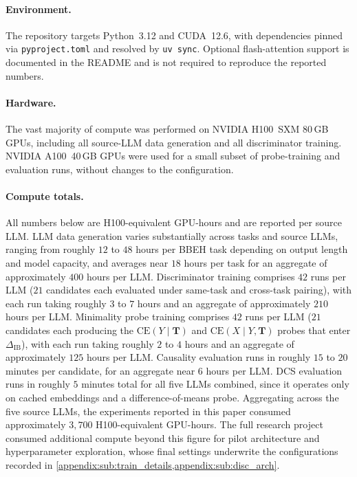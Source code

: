 \paragraph{Environment.} The repository targets Python~3.12 and CUDA~12.6, with dependencies pinned via \texttt{pyproject.toml} and resolved by \texttt{uv sync}. Optional flash-attention support is documented in the README and is not required to reproduce the reported numbers.

\paragraph{Hardware.} The vast majority of compute was performed on NVIDIA H100~SXM 80\,GB GPUs, including all source-LLM data generation and all discriminator training. NVIDIA A100~40\,GB GPUs were used for a small subset of probe-training and evaluation runs, without changes to the configuration.

\paragraph{Compute totals.} All numbers below are H100-equivalent GPU-hours and are reported per source LLM. LLM data generation varies substantially across tasks and source LLMs, ranging from roughly $12$ to $48$ hours per BBEH task depending on output length and model capacity, and averages near $18$ hours per task for an aggregate of approximately $400$ hours per LLM. Discriminator training comprises $42$ runs per LLM ($21$ candidates each evaluated under same-task and cross-task pairing), with each run taking roughly $3$ to $7$ hours and an aggregate of approximately $210$ hours per LLM. Minimality probe training comprises $42$ runs per LLM ($21$ candidates each producing the $\mathrm{CE}(Y\mid\mathbf{T})$ and $\mathrm{CE}(X\mid Y, \mathbf{T})$ probes that enter $\Delta_{\mathrm{IB}}$), with each run taking roughly $2$ to $4$ hours and an aggregate of approximately $125$ hours per LLM. Causality evaluation runs in roughly $15$ to $20$ minutes per candidate, for an aggregate near $6$ hours per LLM. DCS evaluation runs in roughly $5$ minutes total for all five LLMs combined, since it operates only on cached embeddings and a difference-of-means probe. Aggregating across the five source LLMs, the experiments reported in this paper consumed approximately $3{,}700$ H100-equivalent GPU-hours. The full research project consumed additional compute beyond this figure for pilot architecture and hyperparameter exploration, whose final settings underwrite the configurations recorded in \cref{appendix:sub:train_details,appendix:sub:disc_arch}.


